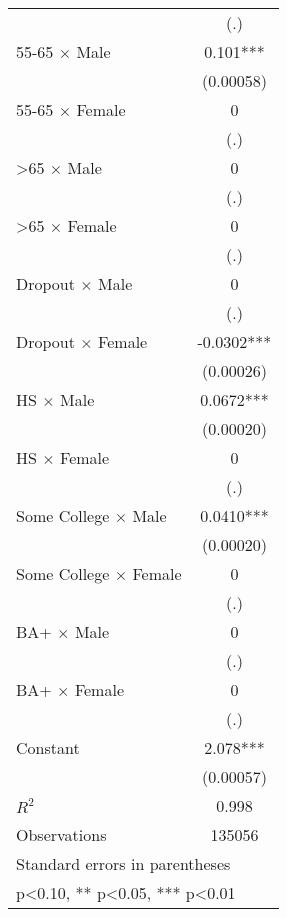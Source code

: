 \begin{table}[htbp]
\begin{tabular}{l*{1}{c}}
                    &         (.)   \\
55-65 $\times$ Male &       0.101***\\
                    &   (0.00058)   \\
55-65 $\times$ Female&           0   \\
                    &         (.)   \\
>65 $\times$ Male   &           0   \\
                    &         (.)   \\
>65 $\times$ Female &           0   \\
                    &         (.)   \\
Dropout $\times$ Male&           0   \\
                    &         (.)   \\
Dropout $\times$ Female&     -0.0302***\\
                    &   (0.00026)   \\
HS $\times$ Male    &      0.0672***\\
                    &   (0.00020)   \\
HS $\times$ Female  &           0   \\
                    &         (.)   \\
Some College $\times$ Male&      0.0410***\\
                    &   (0.00020)   \\
Some College $\times$ Female&           0   \\
                    &         (.)   \\
BA+ $\times$ Male   &           0   \\
                    &         (.)   \\
BA+ $\times$ Female &           0   \\
                    &         (.)   \\
Constant            &       2.078***\\
                    &   (0.00057)   \\
\midrule
\(R^{2}\)           &       0.998   \\
Observations        &      135056   \\
\bottomrule
\multicolumn{2}{l}{\footnotesize Standard errors in parentheses}\\
\multicolumn{2}{l}{\footnotesize * p<0.10, ** p<0.05, *** p<0.01}\\
\end{tabular}
\end{table}